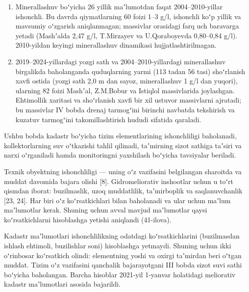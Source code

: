 \begin{enumerate}
  bilan baholanishi kerak.
\item
  Minerallashuv boʻyicha 26 yillik maʼlumotdan faqat 2004--2010-yillar
  ishonchli. Bu davrda qiymatlarning 60 foizi 1--3 g/l, ishonchli koʻp
  yillik va mavsumiy oʻzgarish aniqlanmagan; massivlar orasidagi farq
  uch baravarga yetadi (Mashʼalda 2,47 g/l, T.Mirzayev va U.Qoraboyevda
  0,80--0,84 g/l). 2010-yildan keyingi minerallashuv dinamikasi
  hujjatlashtirilmagan.
\item
  2019--2024-yillardagi yozgi sath va 2004--2010-yillardagi
  minerallashuv birgalikda baholanganda quduqlarning yarmi (113 tadan 56
  tasi) shoʻrlanish xavfi ostida (yozgi sath 2,0 m dan sayoz,
  minerallashuv 1 g/l dan yuqori), ularning 82 foizi Mashʼal, Z.M.Bobur
  va Istiqlol massivlarida joylashgan. Ehtimollik xaritasi va
  shoʻrlanish xavfi bir xil ustuvor massivlarni ajratadi; bu massivlar
  IV bobda drenaj tarmogʻini birinchi navbatda tekshirish va kuzatuv
  tarmogʻini takomillashtirish hududi sifatida qaraladi.
\end{enumerate}


Ushbu bobda kadastr boʻyicha tizim elementlarining ishonchliligi
baholanadi, kollektorlarning suv oʻtkazishi tahlil qilinadi, taʼmirning
sizot sathiga taʼsiri va narxi oʻrganiladi hamda monitoringni yaxshilash
boʻyicha tavsiyalar beriladi.


Texnik obyektning ishonchliligi --- uning oʻz vazifasini belgilangan
sharoitda va muddat davomida bajara olishi {[}8{]}. Gidromeliorativ
inshootlar uchun u toʻrt qismdan iborat: buzilmaslik, uzoq muddatlilik,
taʼmirboplik va saqlanuvchanlik {[}23, 24{]}. Har biri oʻz
koʻrsatkichlari bilan baholanadi va ular uchun maʼlum maʼlumotlar kerak.
Shuning uchun avval mavjud maʼlumotlar qaysi koʻrsatkichlarni
hisoblashga yetishi aniqlandi (41-ilova).

Kadastr maʼlumotlari ishonchlilikning odatdagi koʻrsatkichlarini
(buzilmasdan ishlash ehtimoli, buzilishlar soni) hisoblashga yetmaydi.
Shuning uchun ikki oʻrinbosar koʻrsatkich olindi: elementning yoshi va
oxirgi taʼmirdan beri oʻtgan muddat. Tizim oʻz vazifasini qanchalik
bajarayotgani III bobda sizot suvi sathi boʻyicha baholangan. Barcha
hisoblar 2021-yil 1-yanvar holatidagi meliorativ kadastr maʼlumotlari
asosida bajarildi.

